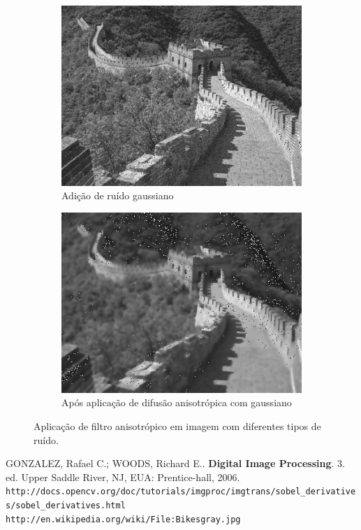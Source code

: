 \documentclass[10pt,a4paper]{article}
\begin{document}
\begin{figure}[!ht]
\begin{subfigure}[ht]{0.4\textwidth}
        \label{fig:china_sp_aniso}
    \end{subfigure}
    \\
    \begin{subfigure}[ht]{0.4\textwidth}
        \includegraphics[width=\textwidth]{china_dst_ga.jpg}
        \caption{\centering Adição de ruído gaussiano}
        \label{fig:china_ga}
    \end{subfigure}
    \qquad
    \begin{subfigure}[ht]{0.4\textwidth}
        \includegraphics[width=\textwidth]{china_aniso_sp.jpg}
        \caption{\centering Após aplicação de difusão anisotrópica com gaussiano}
        \label{fig:china_ga_aniso}
    \end{subfigure}
    \caption{Aplicação de filtro anisotrópico em imagem com diferentes tipos de ruído.}
    \label{fig:china}
\end{figure}

\begin{thebibliography}{99}
     GONZALEZ, Rafael C.; WOODS, Richard E.. \textbf{Digital Image Processing}. 3. ed. Upper Saddle River, NJ, EUA: Prentice-hall, 2006.
     \texttt{http://docs.opencv.org/doc/tutorials/imgproc/imgtrans/sobel\_derivatives/sobel\_derivatives.html}
     \texttt{http://en.wikipedia.org/wiki/File:Bikesgray.jpg}
\end{thebibliography}
\end{document}
